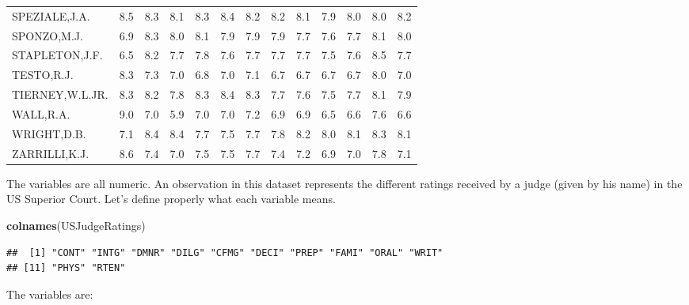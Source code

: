 \documentclass[]{article}
\newenvironment{Shaded}{\begin{snugshade}}{\end{snugshade}}
\newcommand{\KeywordTok}[1]{\textcolor[rgb]{0.13,0.29,0.53}{\textbf{#1}}}
\newcommand{\NormalTok}[1]{#1}
\begin{document}
\begin{table}
\begin{tabular}[t]{lrrrrrrrrrrrr}
\addlinespace
SPEZIALE,J.A. & 8.5 & 8.3 & 8.1 & 8.3 & 8.4 & 8.2 & 8.2 & 8.1 & 7.9 & 8.0 & 8.0 & 8.2\\
\rowcolor{gray!6}  SPONZO,M.J. & 6.9 & 8.3 & 8.0 & 8.1 & 7.9 & 7.9 & 7.9 & 7.7 & 7.6 & 7.7 & 8.1 & 8.0\\
STAPLETON,J.F. & 6.5 & 8.2 & 7.7 & 7.8 & 7.6 & 7.7 & 7.7 & 7.7 & 7.5 & 7.6 & 8.5 & 7.7\\
\rowcolor{gray!6}  TESTO,R.J. & 8.3 & 7.3 & 7.0 & 6.8 & 7.0 & 7.1 & 6.7 & 6.7 & 6.7 & 6.7 & 8.0 & 7.0\\
TIERNEY,W.L.JR. & 8.3 & 8.2 & 7.8 & 8.3 & 8.4 & 8.3 & 7.7 & 7.6 & 7.5 & 7.7 & 8.1 & 7.9\\
\addlinespace
\rowcolor{gray!6}  WALL,R.A. & 9.0 & 7.0 & 5.9 & 7.0 & 7.0 & 7.2 & 6.9 & 6.9 & 6.5 & 6.6 & 7.6 & 6.6\\
WRIGHT,D.B. & 7.1 & 8.4 & 8.4 & 7.7 & 7.5 & 7.7 & 7.8 & 8.2 & 8.0 & 8.1 & 8.3 & 8.1\\
\rowcolor{gray!6}  ZARRILLI,K.J. & 8.6 & 7.4 & 7.0 & 7.5 & 7.5 & 7.7 & 7.4 & 7.2 & 6.9 & 7.0 & 7.8 & 7.1\\
\bottomrule
\end{tabular}
\end{table}

The variables are all numeric. An observation in this dataset represents
the different ratings received by a judge (given by his name) in the US
Superior Court. Let's define properly what each variable means.

\begin{Shaded}
\begin{Highlighting}[]
\KeywordTok{colnames}\NormalTok{(USJudgeRatings)}
\end{Highlighting}
\end{Shaded}

\begin{verbatim}
##  [1] "CONT" "INTG" "DMNR" "DILG" "CFMG" "DECI" "PREP" "FAMI" "ORAL" "WRIT"
## [11] "PHYS" "RTEN"
\end{verbatim}

The variables are:
\end{document}
